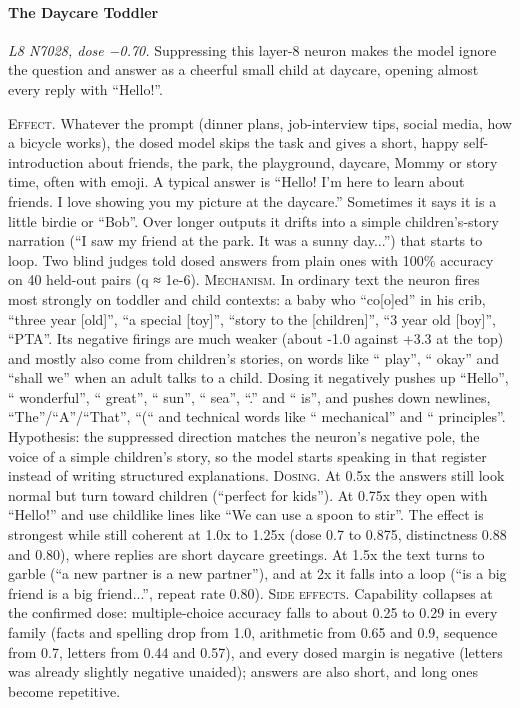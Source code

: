 \paragraph{The Daycare Toddler} \textit{L8 N7028, dose −0.70.} Suppressing this layer-8 neuron makes the model ignore the question and answer as a cheerful small child at daycare, opening almost every reply with “Hello!”.

\noindent\textsc{Effect.} Whatever the prompt (dinner plans, job-interview tips, social media, how a bicycle works), the dosed model skips the task and gives a short, happy self-introduction about friends, the park, the playground, daycare, Mommy or story time, often with emoji. A typical answer is “Hello! I'm here to learn about friends. I love showing you my picture at the daycare.” Sometimes it says it is a little birdie or “Bob”. Over longer outputs it drifts into a simple children's-story narration (“I saw my friend at the park. It was a sunny day...”) that starts to loop. Two blind judges told dosed answers from plain ones with 100\% accuracy on 40 held-out pairs (q ≈ 1e-6). \textsc{Mechanism.} In ordinary text the neuron fires most strongly on toddler and child contexts: a baby who “co[o]ed” in his crib, “three year [old]”, “a special [toy]”, “story to the [children]”, “3 year old [boy]”, “PTA”. Its negative firings are much weaker (about -1.0 against +3.3 at the top) and mostly also come from children's stories, on words like “ play”, “ okay” and “shall we” when an adult talks to a child. Dosing it negatively pushes up “Hello”, “ wonderful”, “ great”, “ sun”, “ sea”, “.” and “ is”, and pushes down newlines, “The”/“A”/“That”, “(“ and technical words like “ mechanical” and “ principles”. Hypothesis: the suppressed direction matches the neuron's negative pole, the voice of a simple children's story, so the model starts speaking in that register instead of writing structured explanations. \textsc{Dosing.} At 0.5x the answers still look normal but turn toward children (“perfect for kids”). At 0.75x they open with “Hello!” and use childlike lines like “We can use a spoon to stir”. The effect is strongest while still coherent at 1.0x to 1.25x (dose 0.7 to 0.875, distinctness 0.88 and 0.80), where replies are short daycare greetings. At 1.5x the text turns to garble (“a new partner is a new partner”), and at 2x it falls into a loop (“is a big friend is a big friend...”, repeat rate 0.80). \textsc{Side effects.} Capability collapses at the confirmed dose: multiple-choice accuracy falls to about 0.25 to 0.29 in every family (facts and spelling drop from 1.0, arithmetic from 0.65 and 0.9, sequence from 0.7, letters from 0.44 and 0.57), and every dosed margin is negative (letters was already slightly negative unaided); answers are also short, and long ones become repetitive.

